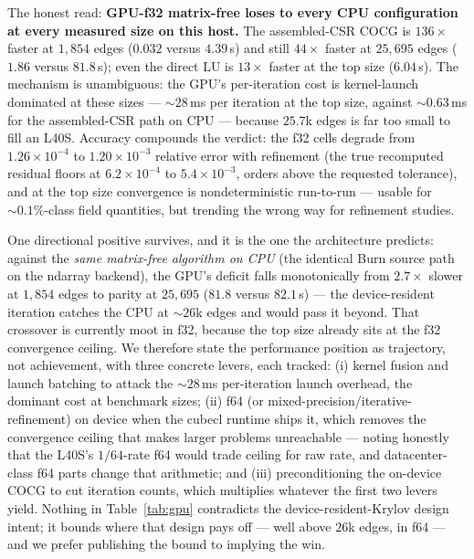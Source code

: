 \documentclass{anvil-paper}
\begin{document}
The honest read: \textbf{GPU-f32 matrix-free loses to every CPU
configuration at every measured size on this host.} The assembled-CSR COCG
is $136\times$ faster at $1{,}854$ edges ($0.032$ versus $4.39$\,s) and
still $44\times$ faster at $25{,}695$ edges ($1.86$ versus $81.8$\,s);
even the direct LU is $13\times$ faster at the top size ($6.04$\,s). The
mechanism is unambiguous: the GPU's per-iteration cost is kernel-launch
dominated at these sizes --- ${\sim}28$\,ms per iteration at the top size,
against ${\sim}0.63$\,ms for the assembled-CSR path on CPU --- because
$25.7$k edges is far too small to fill an L40S. Accuracy compounds the
verdict: the f32 cells degrade from $1.26\times10^{-4}$ to
$1.20\times10^{-3}$ relative error with refinement (the true recomputed
residual floors at $6.2\times10^{-4}$ to $5.4\times10^{-3}$, orders above
the requested tolerance), and at the top size convergence is
nondeterministic run-to-run --- usable for ${\sim}0.1\%$-class field
quantities, but trending the wrong way for refinement studies.

One directional positive survives, and it is the one the architecture
predicts: against the \emph{same matrix-free algorithm on CPU} (the
identical Burn source path on the ndarray backend), the GPU's deficit
falls monotonically from $2.7\times$ slower at $1{,}854$ edges to parity
at $25{,}695$ ($81.8$ versus $82.1$\,s) --- the device-resident iteration
catches the CPU at ${\sim}26$k edges and would pass it beyond. That
crossover is currently moot in f32, because the top size already sits at
the f32 convergence ceiling. We therefore state the performance position
as trajectory, not achievement, with three concrete levers, each tracked:
(i) kernel fusion and launch batching to attack the ${\sim}28$\,ms
per-iteration launch overhead, the dominant cost at benchmark sizes;
(ii) f64 (or mixed-precision/iterative-refinement) on device when the
cubecl runtime ships it, which removes the convergence ceiling that makes
larger problems unreachable --- noting honestly that the L40S's
$1/64$-rate f64 would trade ceiling for raw rate, and datacenter-class
f64 parts change that arithmetic; and (iii) preconditioning the on-device
COCG to cut iteration counts, which multiplies whatever the first two
levers yield. Nothing in Table~\ref{tab:gpu} contradicts the
device-resident-Krylov design intent; it bounds where that design pays
off --- well above $26$k edges, in f64 --- and we prefer publishing the
bound to implying the win.

\end{document}
